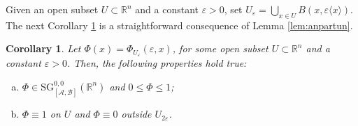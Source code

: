 \documentclass[11pt,reqno]{amsart}
\numberwithin{equation}{section}
\newtheorem{corollary}[theorem]{Corollary}
\newcommand{\SG}{{\mathrm{SG}}}
\newcommand{\A}{{\mathcal{A}}} %
\newcommand{\B}{{\mathcal{B}}} %
\begin{document}
Given an open subset $U\subset\mathbb{R}^n$ and a constant $\varepsilon>0$, set $U_\varepsilon=\bigcup_{x\in U}B(x,\varepsilon\langle x\rangle)$. 
The next Corollary \ref{coro_Phi} is a straightforward consequence of Lemma \ref{lem:anpartun}.

\begin{corollary}\label{coro_Phi}
	Let $\Phi(x)=\Phi_{U_\varepsilon}(\varepsilon,x)$, for some open subset $U\subset\mathbb{R}^n$ and a constant $\varepsilon>0$. 
	Then, the following properties hold true:
	\begin{enumerate}[(a)]
		\item $\Phi\in {\SG}_{[\A,\B]}^{0,0}(\mathbb{R}^n)$ and $0\leq\Phi\leq 1$;
		\item $\Phi\equiv 1$ on $U$ and $\Phi\equiv 0$ outside $U_{2\varepsilon}$.
	\end{enumerate}
\end{corollary}
\end{document}
